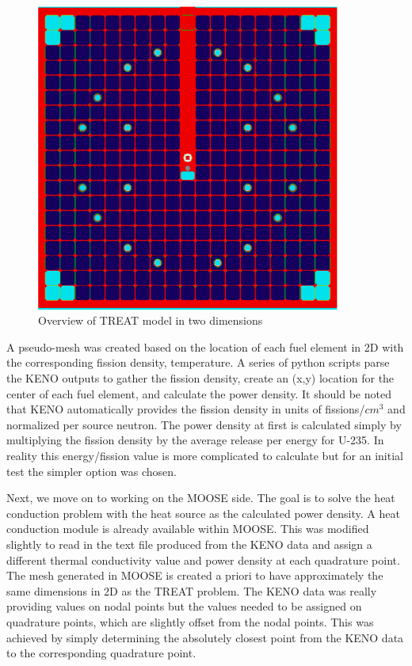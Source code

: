 \documentclass[11pt]{article}
\begin{document}
\begin{figure}
    \centering
    \includegraphics[width=10cm]{figures/treat_top_view.png}
    \caption{Overview of TREAT model in two dimensions}
    \label{fig:treat2d}
\end{figure}

A pseudo-mesh was created based on the location of each fuel element in 2D with the corresponding fission density, temperature.  A series of python scripts parse the KENO outputs to gather the fission density, create an (x,y) location for the center of each fuel element, and calculate the power density. It should be noted that KENO automatically provides the fission density in units of fissions/$cm^3$ and normalized per source neutron. The power density at first is calculated simply by multiplying the fission density by the average release per energy for U-235.  In reality this energy/fission value is more complicated to calculate but for an initial test the simpler option was chosen.  

	Next, we move on to working on the MOOSE side.  The goal is to solve the heat conduction problem with the heat source as the calculated power density. A heat conduction module is already available within MOOSE.  This was modified slightly to read in the text file produced from the KENO data and assign a different thermal conductivity value and power density at each quadrature point.  The mesh generated in MOOSE is created a priori to have approximately the same dimensions in 2D as the TREAT problem.  The KENO data was really providing values on nodal points but the values needed to be assigned on quadrature points, which are slightly offset from the nodal points.  This was achieved by simply determining the absolutely closest point from the KENO data to the corresponding quadrature point. 
	
\end{document}
